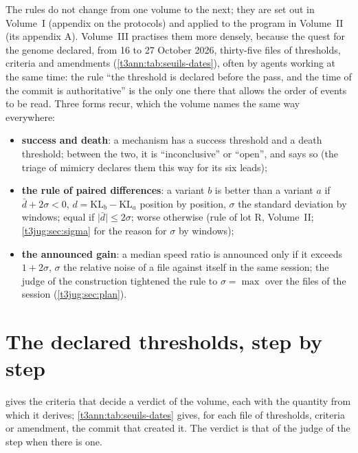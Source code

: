 The rules do not change from one volume to the next; they are set out in Volume~I (appendix on the protocols) and applied to the program in Volume~II (its appendix A). Volume~III practises them more densely, because the quest for the genome declared, from 16 to 27 October 2026, thirty-five files of thresholds, criteria and amendments (\cref{t3ann:tab:seuils-dates}), often by agents working at the same time: the rule ``the threshold is declared before the pass, and the time of the commit is authoritative'' is the only one there that allows the order of events to be read. Three forms recur, which the volume names the same way everywhere:
\begin{itemize}
\item \textbf{success and death}: a mechanism has a success threshold and a death threshold; between the two, it is ``inconclusive'' or ``open'', and says so (the triage of mimicry declares them this way for its six leads);
\item \textbf{the rule of paired differences}: a variant $b$ is better than a variant $a$ if $\bar d + 2\sigma < 0$, $d = \mathrm{KL}_b - \mathrm{KL}_a$ position by position, $\sigma$ the standard deviation by windows; equal if $\lvert \bar d\rvert \le 2\sigma$; worse otherwise (rule of lot R, Volume~II; \cref{t3jug:sec:sigma} for the reason for $\sigma$ by windows);
\item \textbf{the announced gain}: a median speed ratio is announced only if it exceeds $1 + 2\sigma$, $\sigma$ the relative noise of a file against itself in the same session; the judge of the construction tightened the rule to $\sigma = \max$ over the files of the session (\cref{t3jug:sec:plan}).
\end{itemize}

\section{The declared thresholds, step by step}\label{t3ann:sec:seuils}

 gives the criteria that decide a verdict of the volume, each with the quantity from which it derives; \cref{t3ann:tab:seuils-dates} gives, for each file of thresholds, criteria or amendment, the commit that created it. The verdict is that of the judge of the step when there is one.

